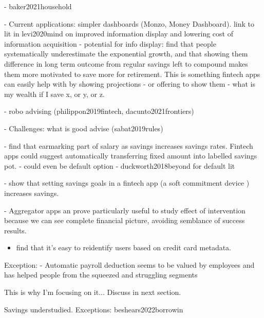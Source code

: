 
- baker2021household



- Current applications: simpler dashboards (Monzo, Money Dashboard). link to
lit in levi2020mind on improved information display and lowering cost of
information acquisition
- potential for info display: \citet{mckenzie2011misunderstanding} find that people systematically
underestimate the exponential growth, and that showing them difference in long
term outcome from regular savings left to compound makes them more motivated to
save more for retirement. This is something fintech apps can easily help with
by showing projections - or offering to show them - what is my wealth if I save
x, or y, or z.

- robo advising (philippon2019fintech, dacunto2021frontiers)

- Challenges: what is good advise (sabat2019rules)

- \citet{soman2011earmarking} find that earmarking part of salary as savings
increases savings rates. Fintech apps could suggest automatically transferring
fixed amount into labelled savings pot.
- could even be default option - duckworth2018beyond for default lit

- \citet{gargano2021goal} show that setting savings goals in a fintech app (a
soft commitment device \citep{beshears2016beyond}) increases savings.


\citet{guttman2021semblance}
- Aggregator apps an prove particularly useful to study effect of intervention
because we can see complete financial picture, avoiding semblance of success
results. 





\begin{itemize}
    \item \citet{demontjoye2015unique} find that it's easy to reidentify users
        based on credit card metadata.
\end{itemize}


Exception:
\citet{philipps2021supporting}
- Automatic payroll deduction seems to be valued by employees and has helped
people from the squeezed and struggling segments 

This is why I'm focusing on it... Discuss in next section.

Savings understudied. Exceptions: 
beshears2022borrowin


